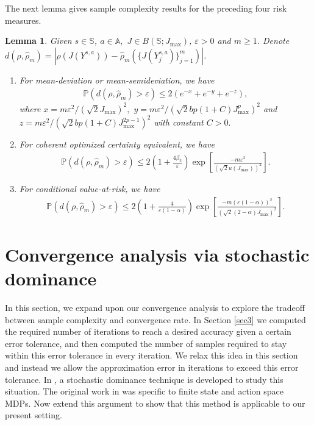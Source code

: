 \documentclass[12pt,technote,onecolumn]{IEEEtran}
\newtheorem{lemma}{Lemma}
\begin{document}
The next lemma gives sample complexity results for the preceding four
risk measures.
\begin{lemma}
	\label{lem:Risk_estimation} Given  $s\in\mathbb{{S}}$,
	$a\in\mathbb{A},$ $J\in B\left(\mathbb{S};J_{\max}\right)$, $\varepsilon>0$
	and $m\geq1$. Denote $d(\rho,\hat{\rho}_m)=|\rho(J(Y^{s,a}))-\hat{\rho}_{m}(\{J(Y_j^{s,a})\}^m_{j=1})|$.
	\begin{enumerate}
		\item For mean-deviation or mean-semideviation, we have	
		\begin{equation*}
		\begin{aligned}
		\mathbb{P}(d(\rho,\hat{\rho}_m)>\varepsilon)
		\leq2(e^{-x}+e^{-y}+e^{-z}),
		\end{aligned}
		\end{equation*}	
		where $x=m\varepsilon^{2}/(\sqrt{2}J_{\max})^{2},$ $y=m\varepsilon^{2}/(\sqrt{2}bp(1+C)J_{\max}^{p})^{2}$
		and $z=m\varepsilon^{2}/(\sqrt{2}bp(1+C)J_{\max}^{2p-1})^{2}$
		with constant $C>0.$ 
		\item For coherent optimized certainty equivalent, we have	
		\begin{equation*}
		\begin{aligned}
		\mathbb{P}(d(\rho,\hat{\rho}_m)>\varepsilon)
		\leq2\left(1+\frac{4\beta_{2}}{\varepsilon}\right)\exp\left[\frac{-m\varepsilon^{2}}{(\sqrt{2}u(J_{\max}))^{2}}\right]
		.
		\end{aligned}
		\end{equation*}
		\item For conditional value-at-risk, we have	
		\begin{equation*}
		\begin{aligned}
		\mathbb{P}(d(\rho,\hat{\rho}_m)>\varepsilon)
		\leq2\left(1+\frac{4}{\varepsilon(1-\alpha)}\right)\exp\left[\frac{-m(\varepsilon(1-\alpha))^{2}}{(\sqrt{2}(2-\alpha)J_{\max})^{2}}\right].
		\end{aligned}
		\end{equation*}
	\end{enumerate}	
\end{lemma}

\section{Convergence analysis via stochastic dominance}\label{sec5}

In this section, we expand upon our convergence analysis to explore
the tradeoff between sample complexity and convergence rate. In Section
\ref{sec3} we computed the required number of iterations to reach a desired
accuracy given a certain error tolerance, and then computed the number
of samples required to stay within this error tolerance in every iteration.
We relax this idea in this section and instead we allow the approximation
error in iterations to exceed this error tolerance. In \cite{Haskell_EDP_2015},
a stochastic dominance technique is developed to study this situation.
The original work in \cite{Haskell_EDP_2015} was specific to finite
state and action space MDPs. Now extend this argument to show that
this method is applicable to our present setting.
\end{document}
